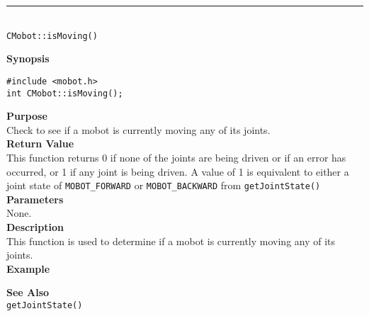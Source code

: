 \noindent
\vspace{5pt}
\rule{4.5in}{0.015in}\\
\noindent
{\LARGE \texttt{CMobot::isMoving()}}\\
{}

\noindent
{\bf Synopsis}
\vspace{-8pt}
\begin{verbatim}
#include <mobot.h>
int CMobot::isMoving();
\end{verbatim}

\noindent
{\bf Purpose}\\
Check to see if a mobot is currently moving any of its joints.\\

\noindent
{\bf Return Value}\\
This function returns 0 if none of the joints are being driven or if an error
has occurred, or 1 if any joint is being driven. A value of 1 is equivalent to 
either a joint state of \texttt{MOBOT\_FORWARD} or \texttt{MOBOT\_BACKWARD} 
from \texttt{getJointState()}\\ 

\noindent
{\bf Parameters}\\
None.\\

\noindent
{\bf Description}\\
This function is used to determine if a mobot is currently moving any of
its joints. \\

\noindent
{\bf Example}\\
\noindent

\noindent
{\bf See Also}\\
\texttt{getJointState()}

